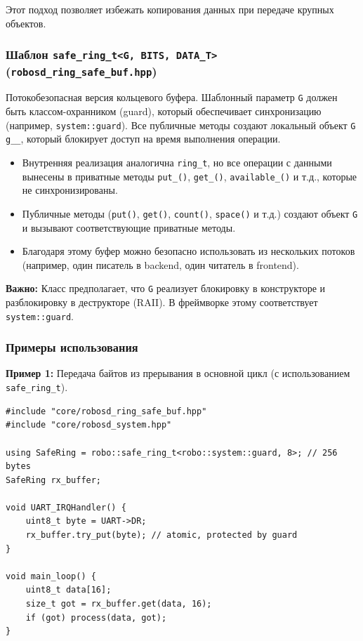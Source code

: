 \documentclass[a4paper,12pt]{article}
\begin{document}
Этот подход позволяет избежать копирования данных при передаче крупных объектов.

\subsubsection{Шаблон \texttt{safe\_ring\_t<G, BITS, DATA\_T>} (\texttt{robosd\_ring\_safe\_buf.hpp})}

Потокобезопасная версия кольцевого буфера. Шаблонный параметр \texttt{G} должен быть классом-охранником (guard), который обеспечивает синхронизацию (например, \texttt{system::guard}). Все публичные методы создают локальный объект \texttt{G g\_\_}, который блокирует доступ на время выполнения операции.

\begin{itemize}
    \item Внутренняя реализация аналогична \texttt{ring\_t}, но все операции с данными вынесены в приватные методы \texttt{put\_()}, \texttt{get\_()}, \texttt{available\_()} и т.д., которые не синхронизированы.
    \item Публичные методы (\texttt{put()}, \texttt{get()}, \texttt{count()}, \texttt{space()} и т.д.) создают объект \texttt{G} и вызывают соответствующие приватные методы.
    \item Благодаря этому буфер можно безопасно использовать из нескольких потоков (например, один писатель в backend, один читатель в frontend).
\end{itemize}

\textbf{Важно:} Класс предполагает, что \texttt{G} реализует блокировку в конструкторе и разблокировку в деструкторе (RAII). В фреймворке этому соответствует \texttt{system::guard}.

\subsubsection{Примеры использования}

\textbf{Пример 1:} Передача байтов из прерывания в основной цикл (с использованием \texttt{safe\_ring\_t}).

\begin{lstlisting}[caption={Thread-safe ring buffer}]
#include "core/robosd_ring_safe_buf.hpp"
#include "core/robosd_system.hpp"

using SafeRing = robo::safe_ring_t<robo::system::guard, 8>; // 256 bytes
SafeRing rx_buffer;

void UART_IRQHandler() {
    uint8_t byte = UART->DR;
    rx_buffer.try_put(byte); // atomic, protected by guard
}

void main_loop() {
    uint8_t data[16];
    size_t got = rx_buffer.get(data, 16);
    if (got) process(data, got);
}
\end{lstlisting}
\end{document}
